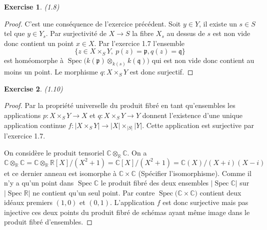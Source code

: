 \documentclass[A4, 11pt]{article}
\newtheorem{exer}{Exercise}
\def\C{{\mathbb C}}
\def\R{{\mathbb R}}
\def\Spec{ \operatorname{Spec}}
\begin{document}
 \begin{exer}(1.8)
 \end{exer}
 \begin{proof}
 C'est une conséquence de l'exercice précédent. Soit $y\in Y$, il existe un $s\in S$ tel que $y\in Y_s$. Par surjectivité de $X\rightarrow S$ la fibre $X_s$ au dessus de $s$ est non vide donc contient un point $x\in X$. Par l'exercice 1.7 l'ensemble 
$$\{z\in X\times_S Y, ~p(z)=\mathfrak{p}, q(z)=\mathfrak{q}\}$$
est homéomorphe à  $\Spec \big( k(\mathfrak{p}) \otimes_{k(s)} k(\mathfrak{q}) \big)$ qui est non vide donc contient au moins un point. Le morphisme $q\colon X\times_S Y$ est donc surjectif.
  \end{proof}
 \begin{exer}(1.10)
 \end{exer}
 \begin{proof}
 Par la propriété universelle du produit fibré en tant qu'ensembles les applications $p\colon X\times_S Y \rightarrow X$ et $q\colon X\times_S Y \rightarrow Y$ donnent l'existence d'une unique application continue $f\colon |X\times_S Y| \rightarrow |X|\times_{|S|} |Y|$. Cette application est surjective par l'exercice 1.7.
 
 On considère le produit tensoriel $\C\otimes_{\R} \C$. On a 
 $$\C\otimes_{\R}\C= \C\otimes_{\R} \R[X]/(X^2+1)= \C[X]/(X^2+1)=\C(X)/(X+i)(X-i)$$
 et ce dernier anneau est isomorphe à $\C\times \C$ (Spécifier l'isomorphisme). 
 Comme il n'y a qu'un point dans $\Spec \C$ le produit fibré des deux ensembles $|\Spec \C|$ sur $|\Spec \R|$ ne contient qu'un seul point. Par contre $\Spec \big(\C \times \C \big)$ contient deux idéaux premiers $(1,0)$ et $(0,1)$. L'application $f$ est donc surjective mais pas injective ces deux points du produit fibré de schémas ayant même image dans le produit fibré d'ensembles. 
 \end{proof}
\end{document}
